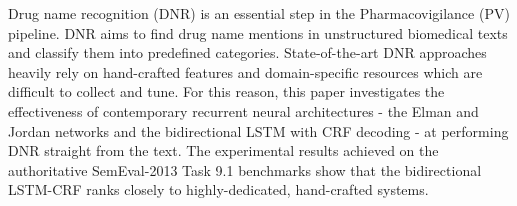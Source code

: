 Drug name recognition (DNR) is an essential step in the Pharmacovigilance (PV) pipeline. DNR aims to find drug name mentions in unstructured biomedical texts and classify them into predefined categories. State-of-the-art DNR approaches heavily rely on hand-crafted features and domain-specific resources which are difficult to collect and tune. For this reason, this paper investigates the effectiveness of contemporary recurrent neural architectures - the Elman and Jordan networks and the bidirectional LSTM with CRF decoding - at performing DNR straight from the text. The experimental results achieved on the authoritative SemEval-2013 Task 9.1 benchmarks show that the bidirectional LSTM-CRF ranks closely to highly-dedicated, hand-crafted systems.
